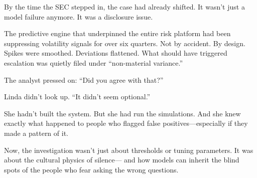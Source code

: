 By the time the SEC stepped in, the case had already shifted.
It wasn’t just a model failure anymore.
It was a disclosure issue.

The predictive engine that underpinned the entire risk platform had been suppressing volatility signals for over six quarters.
Not by accident. By design.
Spikes were smoothed. Deviations flattened.
What should have triggered escalation was quietly filed under “non-material variance.”

The analyst pressed on:
“Did you agree with that?”

Linda didn’t look up.
“It didn’t seem optional.”

She hadn’t built the system. But she had run the simulations.
And she knew exactly what happened to people who flagged false positives—especially if they made a pattern of it.

Now, the investigation wasn’t just about thresholds or tuning parameters.
It was about the cultural physics of silence—
and how models can inherit the blind spots of the people who fear asking the wrong questions.


\medskip

